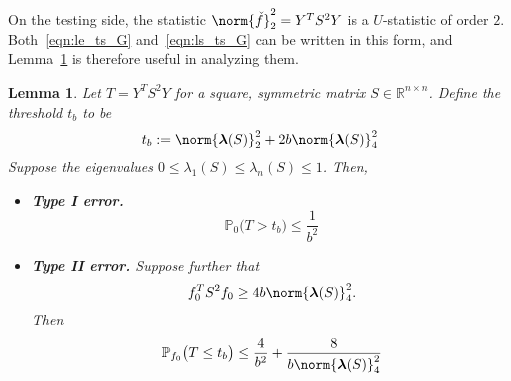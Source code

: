 \documentclass{article}
\newcommand{\Reals}{\mathbb{R}}
\newcommand{\1}{\mathbf{1}}
\newcommand{\lambdavec}{\boldsymbol{\lambda}}
\newcommand{\Pbb}{\mathbb{P}}
\theoremstyle{alden}
\theoremstyle{aldenthm}
\newtheorem{lemma}{Lemma}
\theoremstyle{definition}
\theoremstyle{remark}
\begin{document}
On the testing side, the statistic $\norm{\check{f}}_2^2 = Y^T S^2 Y$ is a $U$-statistic of order $2$. Both~\eqref{eqn:le_ts_G} and~\eqref{eqn:ls_ts_G} can be written in this form, and Lemma~\ref{lem:linear_smoother_fixed_graph_testing} is therefore useful in analyzing them.
\begin{lemma}
	\label{lem:linear_smoother_fixed_graph_testing}
	Let $T = Y^T S^2 Y$ for a square, symmetric matrix $S \in \Reals^{n \times n}$. Define the threshold $t_b$ to be 
	\begin{equation}
	t_{b} := \norm{\lambdavec(S)}_2^2 + 2b \norm{\lambdavec(S)}_4^2
	\end{equation}
	Suppose the eigenvalues $0 \leq \lambda_{1}(S) \leq \lambda_{n}(S) \leq 1$. Then,
	\begin{itemize}
		\item \textbf{Type I error.}
		\begin{equation}
		\label{eqn:linear_smoother_fixed_graph_testing_typeI}
		\Pbb_0\bigl(T > t_b\bigr) \leq \frac{1}{b^2}
		\end{equation}
		\item \textbf{Type II error.} Suppose further that
		\begin{equation}
		\label{eqn:linear_smoother_fixed_graph_testing_critical_radius}
		f_0^T S^2 f_0 \geq 4b \norm{\lambdavec(S)}_4^2.
		\end{equation}
		Then
		\begin{equation}
		\label{eqn:linear_smoother_fixed_graph_testing_typeII}
		\Pbb_{f_0}\bigl(T \leq t_b\bigr) \leq \frac{4}{b^2} + \frac{8}{b \norm{\lambdavec(S)}_4^{2}} 
		\end{equation}
	\end{itemize}
\end{lemma}
\end{document}
